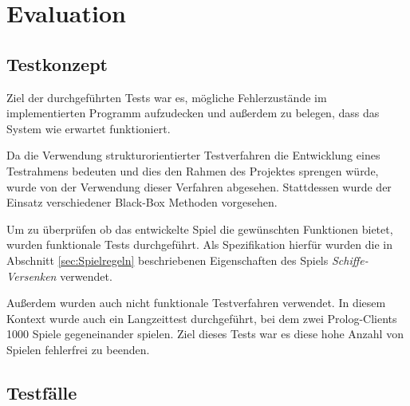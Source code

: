 \section{Evaluation} \label{sec:Evaluation}

\subsection{Testkonzept}

	Ziel der durchgeführten Tests war es, mögliche Fehlerzustände im implementierten Programm aufzudecken und außerdem zu belegen, dass das System
	wie erwartet funktioniert. 
	
	Da die Verwendung strukturorientierter Testverfahren die Entwicklung eines Testrahmens bedeuten und dies den Rahmen des Projektes sprengen würde,
	wurde von der Verwendung dieser Verfahren abgesehen.  
	Stattdessen wurde der Einsatz verschiedener Black-Box Methoden vorgesehen.
	
	Um zu überprüfen ob das entwickelte Spiel die gewünschten Funktionen bietet, wurden funktionale Tests durchgeführt. 
	Als Spezifikation hierfür wurden die in Abschnitt \ref{sec:Spielregeln} beschriebenen Eigenschaften des Spiels \textit{Schiffe-Versenken}
	verwendet. 
	
	
	Außerdem wurden auch nicht funktionale Testverfahren verwendet. In diesem Kontext wurde auch ein Langzeittest durchgeführt, bei dem zwei
	Prolog-Clients 1000 Spiele gegeneinander spielen. Ziel dieses Tests war es diese hohe Anzahl von Spielen fehlerfrei zu beenden. 	
	

\subsection{Testfälle}

